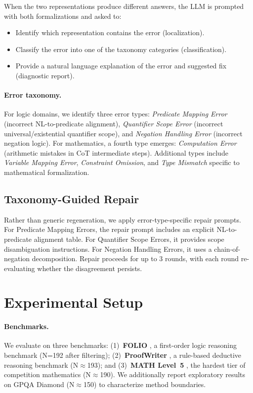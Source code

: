 \documentclass[11pt,a4paper]{article}
\begin{document}
When the two representations produce different answers, the LLM is prompted with both formalizations and asked to:
\begin{itemize}[leftmargin=*,itemsep=1pt]
\item Identify which representation contains the error (localization).
\item Classify the error into one of the taxonomy categories (classification).
\item Provide a natural language explanation of the error and suggested fix (diagnostic report).
\end{itemize}

\paragraph{Error taxonomy.}
For logic domains, we identify three error types: \emph{Predicate Mapping Error} (incorrect NL-to-predicate alignment), \emph{Quantifier Scope Error} (incorrect universal/existential quantifier scope), and \emph{Negation Handling Error} (incorrect negation logic). For mathematics, a fourth type emerges: \emph{Computation Error} (arithmetic mistakes in CoT intermediate steps). Additional types include \emph{Variable Mapping Error}, \emph{Constraint Omission}, and \emph{Type Mismatch} specific to mathematical formalization.

\subsection{Taxonomy-Guided Repair}
\label{sec:repair-method}

Rather than generic regeneration, we apply error-type-specific repair prompts. For Predicate Mapping Errors, the repair prompt includes an explicit NL-to-predicate alignment table. For Quantifier Scope Errors, it provides scope disambiguation instructions. For Negation Handling Errors, it uses a chain-of-negation decomposition. Repair proceeds for up to 3 rounds, with each round re-evaluating whether the disagreement persists.

\section{Experimental Setup}
\label{sec:setup}

\paragraph{Benchmarks.}
We evaluate on three benchmarks: (1)~\textbf{FOLIO} \cite{han2022folio}, a first-order logic reasoning benchmark (N=192 after filtering); (2)~\textbf{ProofWriter} \cite{tafjord2021proofwriter}, a rule-based deductive reasoning benchmark (N$\approx$193); and (3)~\textbf{MATH Level~5} \cite{hendrycks2021math}, the hardest tier of competition mathematics (N$\approx$190). We additionally report exploratory results on GPQA Diamond \cite{rein2024gpqa} (N$\approx$150) to characterize method boundaries.
\end{document}
